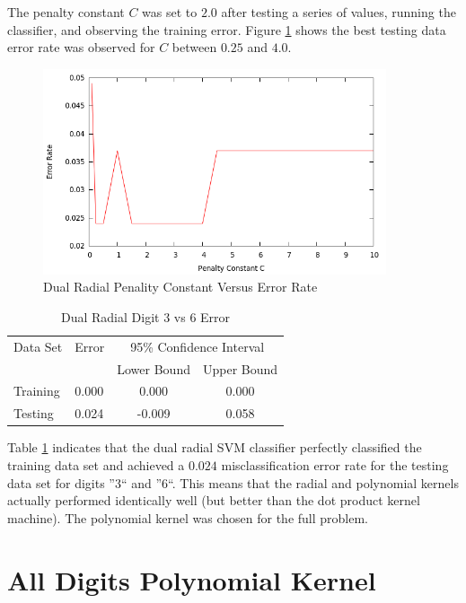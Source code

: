 \documentclass{article}
\begin{document}
The penalty constant \(C\) was set to \(2.0\) after testing a series of values, running the classifier, and observing the training error. Figure \ref{cvserror2} shows the best testing data error rate was observed for \(C\) between \(0.25\) and \(4.0\).

\begin{figure}\label{cvserror2}
\centering
\includegraphics[width=0.9\textwidth]{radial_c_vs_error_rate.png}
\caption{Dual Radial Penality Constant Versus Error Rate}
\end{figure}

\begin{table}\label{table4}
\caption{Dual Radial Digit 3 vs 6 Error}
\begin{center}
\begin{tabular}{llcc}
\toprule
Data Set & Error & \multicolumn{2}{c}{95\% Confidence Interval} \\
\cmidrule(r){3-4}
& & Lower Bound & Upper Bound \\
\midrule
Training & 0.000 & 0.000 & 0.000 \\
Testing & 0.024 & -0.009 & 0.058 \\
\bottomrule
\end{tabular}
\end{center}
\end{table}

Table \ref{table4} indicates that the dual radial SVM classifier perfectly classified the training data set and achieved a \(0.024\) misclassification error rate for the testing data set for digits ''3`` and ''6``. This means that the radial and polynomial kernels actually performed identically well (but better than the dot product kernel machine). The polynomial kernel was chosen for the full problem.

\section{All Digits Polynomial Kernel}\label{full1}
\end{document}
